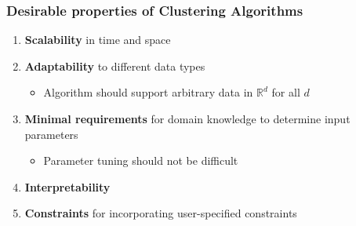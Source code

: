 \documentclass[letterpaper,12pt]{article}
\begin{document}
\subsubsection{Desirable properties of Clustering Algorithms}
\begin{enumerate}
 \item \textbf{Scalability} in time and space
 \item \textbf{Adaptability} to different data types
       \begin{itemize}
        \item Algorithm should support arbitrary data in $\mathbb{R}^d$ for all $d$
       \end{itemize}
 \item \textbf{Minimal requirements} for domain knowledge to determine input parameters
       \begin{itemize}
        \item Parameter tuning should not be difficult
       \end{itemize}
 \item \textbf{Interpretability}
 \item \textbf{Constraints} for incorporating user-specified constraints
\end{enumerate}
\end{document}
